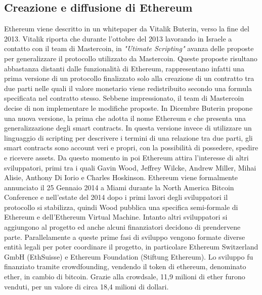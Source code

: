 \subsection{Creazione e diffusione di Ethereum}

Ethereum viene descritto in un whitepaper\cite{K20} da Vitalik Buterin, verso la fine del 2013.
Vitalik riporta che durante l'ottobre del 2013 lavorando in Israele a contatto con il team di Mastercoin, in \textit{"Utimate Scripting"} avanza delle proposte per generalizzare il protocollo utilizzato da Mastercoin. Queste proposte risultano abbastanza distanti dalle funzionalità di Ethereum, rappresentano infatti una prima versione di un protocollo finalizzato solo alla creazione di un contratto tra due parti nelle quali il valore monetario viene redistribuito secondo una formula specificata nel contratto stesso. Sebbene impressionato, il team di Mastercoin decise di non implementare le modifiche proposte. In Dicembre Buterin propone una nuova versione, la prima che adotta il nome Ethereum e che presenta una generalizzazione degli smart contracts. In questa versione invece di utilizzare un linguaggio di scripting per descrivere i termini di una relazione tra due parti, gli smart contracts sono account veri e propri, con la possibilità di possedere, spedire e ricevere assets\cite{K21}. Da questo momento in poi Ethereum attira l'interesse di altri sviluppatori, primi tra i quali Gavin Wood, Jeffrey Wilcke, Andrew Miller, Mihai Alisie, Anthony Di Iorio e Charles Hoskinson. 
Ethereum viene formalmente annunciato il 25 Gennaio 2014 a Miami durante la North America Bitcoin Conference  e nell'estate del 2014 dopo i primi lavori degli sviluppatori il protocollo si stabilizza, quindi Wood pubblica una specifica semi-formale di Ethereum e dell'Ethereum Virtual Machine\cite{K22}. Intanto altri sviluppatori si aggiungono al progetto ed anche alcuni finanziatori decidono di prendervene parte.
Parallelamente a queste prime fasi di sviluppo vengono formate diverse entità legali per poter coordinare il progetto, in particolare Ethereum Switzerland GmbH (EthSuisse) e Ethereum Foundation (Stiftung Ethereum). Lo sviluppo fu finanziato tramite crowdfounding, vendendo il token di ethereum, denominato ether, in cambio di bitcoin. Grazie alla crowdsale, 11,9 milioni di ether furono venduti, per un valore di circa 18,4 milioni di dollari. 

